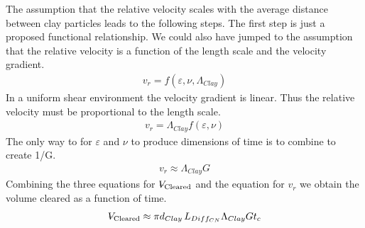 \documentclass[letterpaper,10pt,english]{sphinxmanual}
\begin{document}
The assumption that the relative velocity scales with the average distance between clay particles leads to the following steps. The first step is just a proposed functional relationship. We could also have jumped to the assumption that the relative velocity is a function of the length scale and the velocity gradient.
\begin{equation}\label{equation:Rapid_Mix/RM_Theory_and_Future_Work:Rapid_Mix/RM_Theory_and_Future_Work:5}
\begin{split}v_r = f \left( \varepsilon ,\nu ,\Lambda_{Clay} \right)\end{split}
\end{equation}
In a uniform shear environment the velocity gradient is linear. Thus the relative velocity must be proportional to the length scale.
\begin{equation}\label{equation:Rapid_Mix/RM_Theory_and_Future_Work:Rapid_Mix/RM_Theory_and_Future_Work:6}
\begin{split}v_r = \Lambda_{Clay} f \left( \varepsilon ,\nu \right)\end{split}
\end{equation}
The only way to for \(\varepsilon\) and \(\nu\) to produce dimensions of time is to combine to create 1/G.
\begin{equation}\label{equation:Rapid_Mix/RM_Theory_and_Future_Work:Rapid_Mix/RM_Theory_and_Future_Work:7}
\begin{split}v_r \approx \Lambda_{Clay} G\end{split}
\end{equation}
Combining the three equations for \({\rlap{\kern.08em--}V_{\rm{Cleared}}}\) and the equation for \(v_r\) we obtain the volume cleared as a function of time.
\begin{equation}\label{equation:Rapid_Mix/RM_Theory_and_Future_Work:Rapid_Mix/RM_Theory_and_Future_Work:8}
\begin{split}{\rlap{\kern.08em--}V_{\rm{Cleared}}} \approx \pi  d_{Clay} \, L_{Diff_{CN}}  \Lambda_{Clay} G  t_c\end{split}
\end{equation}
\end{document}
